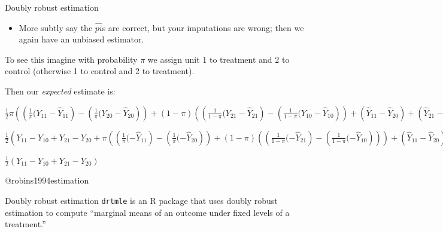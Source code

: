 \documentclass[
  11pt,
  ignorenonframetext,
]{beamer}
\newenvironment{Shaded}{\begin{snugshade}}{\end{snugshade}}
\newcommand{\AttributeTok}[1]{\textcolor[rgb]{0.40,0.45,0.13}{#1}}
\newcommand{\DecValTok}[1]{\textcolor[rgb]{0.68,0.00,0.00}{#1}}
\newcommand{\FunctionTok}[1]{\textcolor[rgb]{0.28,0.35,0.67}{#1}}
\newcommand{\NormalTok}[1]{\textcolor[rgb]{0.00,0.23,0.31}{#1}}
\newcommand{\OtherTok}[1]{\textcolor[rgb]{0.00,0.23,0.31}{#1}}
\newcommand{\SpecialCharTok}[1]{\textcolor[rgb]{0.37,0.37,0.37}{#1}}
\newcommand{\StringTok}[1]{\textcolor[rgb]{0.13,0.47,0.30}{#1}}
\providecommand{\tightlist}{%
  \setlength{\itemsep}{0pt}\setlength{\parskip}{0pt}}\usepackage{longtable,booktabs,array}
\begin{document}
\begin{frame}{Doubly robust estimation}
\protect\hypertarget{doubly-robust-estimation-3}{}
\begin{itemize}
\tightlist
\item
  More subtly say the \(\hat{pi}\)s are correct, but your imputations
  are wrong; then we again have an unbiased estimator.
\end{itemize}

To see this imagine with probability \(\pi\) we assign unit 1 to
treatment and 2 to control (otherwise 1 to control and 2 to treatment).

Then our \emph{expected} estimate is:

\(\frac12\pi\left(\left(\frac{1}{\pi}(Y_{11} - \hat{Y}_{11}\right) - \left(\frac{1}{\pi}(Y_{20} - \hat{Y}_{20}\right) \right) + (1-\pi)\left(\left(\frac{1}{1-\pi}(Y_{21} - \hat{Y}_{21}\right) - \left(\frac{1}{1-\pi}(Y_{10} - \hat{Y}_{10}\right) \right) + \left(\hat{Y}_{11} - \hat{Y}_{20}\right) + \left(\hat{Y}_{21} - \hat{Y}_{10}\right)\)

\(\frac12\left(Y_{11} - Y_{10} + Y_{21}- Y_{20} +\pi\left(\left(\frac{1}{\pi}( - \hat{Y}_{11}\right) - \left(\frac{1}{\pi}( - \hat{Y}_{20}\right) \right) + (1-\pi)\left(\left(\frac{1}{1-\pi}( - \hat{Y}_{21}\right) - \left(\frac{1}{1-\pi}(- \hat{Y}_{10}\right) \right)\right) + \left(\hat{Y}_{11} - \hat{Y}_{20}\right) + \left(\hat{Y}_{21} - \hat{Y}_{10}\right)\)

\(\frac12\left(Y_{11} - Y_{10} + Y_{21}- Y_{20}\right)\)

@robins1994estimation
\end{frame}

\begin{frame}[fragile]{Doubly robust estimation}
\protect\hypertarget{doubly-robust-estimation-4}{}
\texttt{drtmle} is an R package that uses doubly robust estimation to
compute ``marginal means of an outcome under fixed levels of a
treatment.''

\begin{Shaded}
\end{Shaded}
\end{frame}
\end{document}
